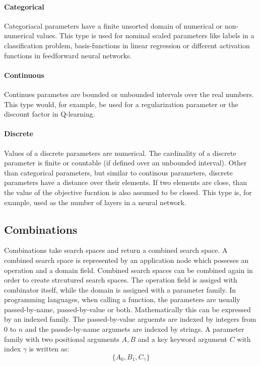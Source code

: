 \documentclass[english]{article}
\begin{document}
\paragraph{Categorical}
Categoriacal parameters have a finite unsorted domain of numerical or non-numerical values. This type is used for nominal scaled parameters like labels in a classification problem, basis-functions in linear regression or different activation functions in feedforward neural networks.

\paragraph{Continuous}
Continues parametes are bounded or unbounded intervals over the real numbers. This type would, for example, be used for a regularization parameter or the discount factor in Q-learning.

\paragraph{Discrete}
Values of a discrete parameters are numerical. The cardinality of a discrete parameter is finite or countable (if defined over an unbounded interval).
Other than categorical parameters, but similar to continous parameters, discrete parameters have a distance over their elements. If two elements are close, than the value of the objective fucntion is also assumed to be closed. This type is, for example, used as the number of layers in a neural network.

\subsection{Combinations}
Combinations take search spaces and return a combined search space. A combined search space is represented by an application node which posseses an operation and a domain field. Combined search spaces can be combined again in order to create strcutured search spaces. The operation field is assiged with combinator itself, while the domain is assigned with a parameter family.
In programming languages, when calling a function, the parameters are usually passed-by-name, passed-by-value or both. Mathematically this can be expressed by an indexed family. The passed-by-value arguemts are indexed by integers from $0$ to $n$ and the passde-by-name argumets are indexed by strings. A parameter family with two positional arguments $A,B$ and a key keyword argument $C$ with index $\gamma$ is written as:
$$\{A_0, B_1, C_\gamma\}$$
\end{document}
